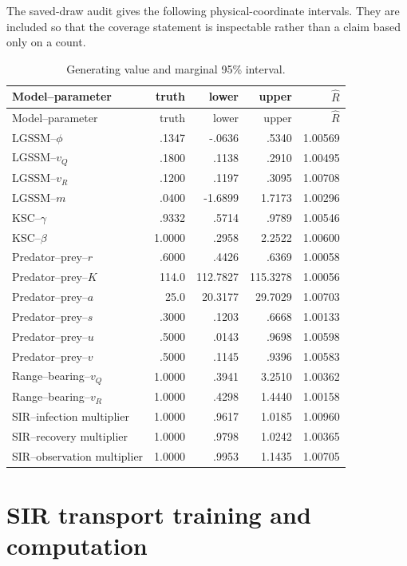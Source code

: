 The saved-draw audit gives the following physical-coordinate intervals.  They
are included so that the coverage statement is inspectable rather than a claim
based only on a count.
\begin{center}\scriptsize
\begin{longtable}{p{}rrr r}
\caption{Generating value and marginal 95\% interval.}\label{tab:bf-surrogate-intervals}\\
\toprule Model--parameter & truth & lower & upper & $\widehat R$\\
\midrule
\endfirsthead
\toprule Model--parameter & truth & lower & upper & $\widehat R$\\
\midrule
\endhead
LGSSM--$\phi$ & .1347 & -.0636 & .5340 & 1.00569\\
LGSSM--$v_Q$ & .1800 & .1138 & .2910 & 1.00495\\
LGSSM--$v_R$ & .1200 & .1197 & .3095 & 1.00708\\
LGSSM--$m$ & .0400 & -1.6899 & 1.7173 & 1.00296\\
KSC--$\gamma$ & .9332 & .5714 & .9789 & 1.00546\\
KSC--$\beta$ & 1.0000 & .2958 & 2.2522 & 1.00600\\
Predator--prey--$r$ & .6000 & .4426 & .6369 & 1.00058\\
Predator--prey--$K$ & 114.0 & 112.7827 & 115.3278 & 1.00056\\
Predator--prey--$a$ & 25.0 & 20.3177 & 29.7029 & 1.00703\\
Predator--prey--$s$ & .3000 & .1203 & .6668 & 1.00133\\
Predator--prey--$u$ & .5000 & .0143 & .9698 & 1.00598\\
Predator--prey--$v$ & .5000 & .1145 & .9396 & 1.00583\\
Range--bearing--$v_Q$ & 1.0000 & .3941 & 3.2510 & 1.00362\\
Range--bearing--$v_R$ & 1.0000 & .4298 & 1.4440 & 1.00158\\
SIR--infection multiplier & 1.0000 & .9617 & 1.0185 & 1.00960\\
SIR--recovery multiplier & 1.0000 & .9798 & 1.0242 & 1.00365\\
SIR--observation multiplier & 1.0000 & .9953 & 1.1435 & 1.00705\\
\bottomrule
\end{longtable}
\end{center}

\section{SIR transport training and computation}
\label{sec:bf-surrogate-sir-neutra}

